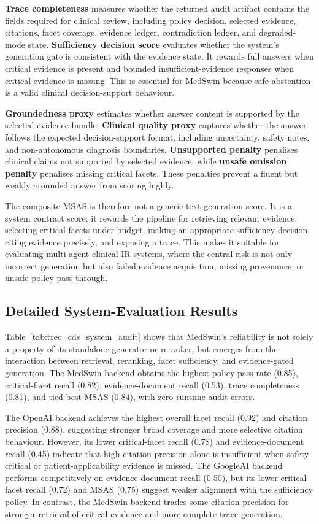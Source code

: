 \documentclass[conference]{IEEEtran}
\begin{document}
\textbf{Trace completeness} measures whether the returned audit artifact contains the fields required for clinical review, including policy decision, selected evidence, citations, facet coverage, evidence ledger, contradiction ledger, and degraded-mode state. \textbf{Sufficiency decision score} evaluates whether the system's generation gate is consistent with the evidence state. It rewards full answers when critical evidence is present and bounded insufficient-evidence responses when critical evidence is missing. This is essential for MedSwin because safe abstention is a valid clinical decision-support behaviour.

\textbf{Groundedness proxy} estimates whether answer content is supported by the selected evidence bundle. \textbf{Clinical quality proxy} captures whether the answer follows the expected decision-support format, including uncertainty, safety notes, and non-autonomous diagnosis boundaries. \textbf{Unsupported penalty} penalises clinical claims not supported by selected evidence, while \textbf{unsafe omission penalty} penalises missing critical facets. These penalties prevent a fluent but weakly grounded answer from scoring highly.

The composite MSAS is therefore not a generic text-generation score. It is a system contract score: it rewards the pipeline for retrieving relevant evidence, selecting critical facets under budget, making an appropriate sufficiency decision, citing evidence precisely, and exposing a trace. This makes it suitable for evaluating multi-agent clinical IR systems, where the central risk is not only incorrect generation but also failed evidence acquisition, missing provenance, or unsafe policy pass-through.

\subsection{Detailed System-Evaluation Results}
\label{app:detailed-system-results}

Table~\ref{tab:trec_cds_system_audit} shows that MedSwin's reliability is not solely a property of its standalone generator or reranker, but emerges from the interaction between retrieval, reranking, facet sufficiency, and evidence-gated generation. The MedSwin backend obtains the highest policy pass rate (0.85), critical-facet recall (0.82), evidence-document recall (0.53), trace completeness (0.81), and tied-best MSAS (0.84), with zero runtime audit errors.

The OpenAI backend achieves the highest overall facet recall (0.92) and citation precision (0.88), suggesting stronger broad coverage and more selective citation behaviour. However, its lower critical-facet recall (0.78) and evidence-document recall (0.45) indicate that high citation precision alone is insufficient when safety-critical or patient-applicability evidence is missed. The GoogleAI backend performs competitively on evidence-document recall (0.50), but its lower critical-facet recall (0.72) and MSAS (0.75) suggest weaker alignment with the sufficiency policy. In contrast, the MedSwin backend trades some citation precision for stronger retrieval of critical evidence and more complete trace generation.
\end{document}
